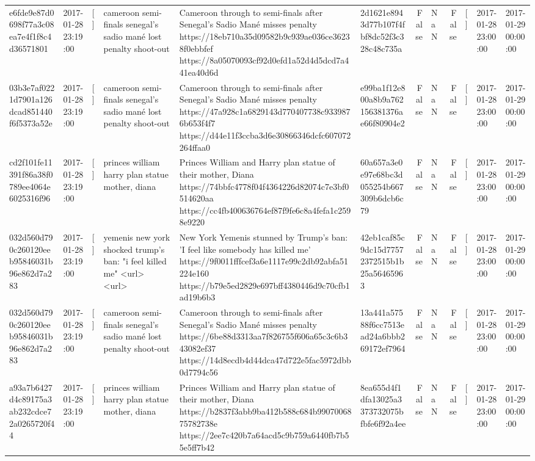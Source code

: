 \begin{tabular}{llllllrlrlll}
e6fde9e87d0698f77a3c08ea7e4f1f8c4d36571801 & 2017-01-28 23:19:00 & [] & cameroon semi-finals senegal's sadio mané lost penalty shoot-out & Cameroon through to semi-finals after Senegal’s Sadio Mané misses penalty https://18eb710a35d09582b9c939ae036ce36238f0ebbfef https://8a05070093cf92d0efd1a52d4d5dcd7a441ea40d6d & 2d1621e8943d77b107f4fbf8dc52f3c328c48c735a & False & NaN & False & [] & 2017-01-28 23:00:00 & 2017-01-29 00:00:00 \\
03b3e7af0221d7901a126dcad851440f6f5373a52e & 2017-01-28 23:19:00 & [] & cameroon semi-finals senegal's sadio mané lost penalty shoot-out & Cameroon through to semi-finals after Senegal’s Sadio Mané misses penalty https://47a928c1a6829143d770407738c9339876b653f4f7 https://d44e11f3ccba3d6e30866346dcfc607072264ffaa0 & e99ba1f12e800a8b9a762156381376ae66f80904e2 & False & NaN & False & [] & 2017-01-28 23:00:00 & 2017-01-29 00:00:00 \\
cd2f101fe11391f86a38f0789ee4064e6025316f96 & 2017-01-28 23:19:00 & [] & princes william harry plan statue mother, diana & Princes William and Harry plan statue of their mother, Diana https://74bbfc4778f04f4364226d82074c7e3bf0514620aa https://cc4fb400636764ef87f9fe6c8a4fefa1c2598e9220 & 60a657a3e0e97e68bc3d055254b667309b6dcb6c79 & False & NaN & False & [] & 2017-01-28 23:00:00 & 2017-01-29 00:00:00 \\
032d560d790c260120eeb95846031b96e862d7a283 & 2017-01-28 23:19:00 & [] & yemenis new york shocked trump's ban: "i feel killed me" <url> <url> & New York Yemenis stunned by Trump's ban: 'I feel like somebody has killed me' https://9f0011fffcef3a6e1117e99c2db92abfa51224e160 https://b79e5ed2829e697bff4380446d9c70cfb1ad19b6b3 & 42eb1caf85c9dc15d77572372515b1b25a56465963 & False & NaN & False & [] & 2017-01-28 23:00:00 & 2017-01-29 00:00:00 \\
032d560d790c260120eeb95846031b96e862d7a283 & 2017-01-28 23:19:00 & [] & cameroon semi-finals senegal's sadio mané lost penalty shoot-out & Cameroon through to semi-finals after Senegal’s Sadio Mané misses penalty https://6be88d3313aa7f826755f606a65c3c6b343082ef37 https://14d8ecdb4d44dca47d722e5fac5972dbb0d7794c56 & 13a441a57588f6cc7513ead24a6bbb269172ef7964 & False & NaN & False & [] & 2017-01-28 23:00:00 & 2017-01-29 00:00:00 \\
a93a7b6427d4c89175a3ab232cdce72a0265720f44 & 2017-01-28 23:19:00 & [] & princes william harry plan statue mother, diana & Princes William and Harry plan statue of their mother, Diana https://b2837f3abb9ba412b588c684b9907006875782738e https://2ee7c420b7a64acd5c9b759a6440fb7b55e5ff7b42 & 8ea655d4f1dfa13025a3373732075bfbfe6f92a4ee & False & NaN & False & [] & 2017-01-28 23:00:00 & 2017-01-29 00:00:00 \\

\end{tabular}
